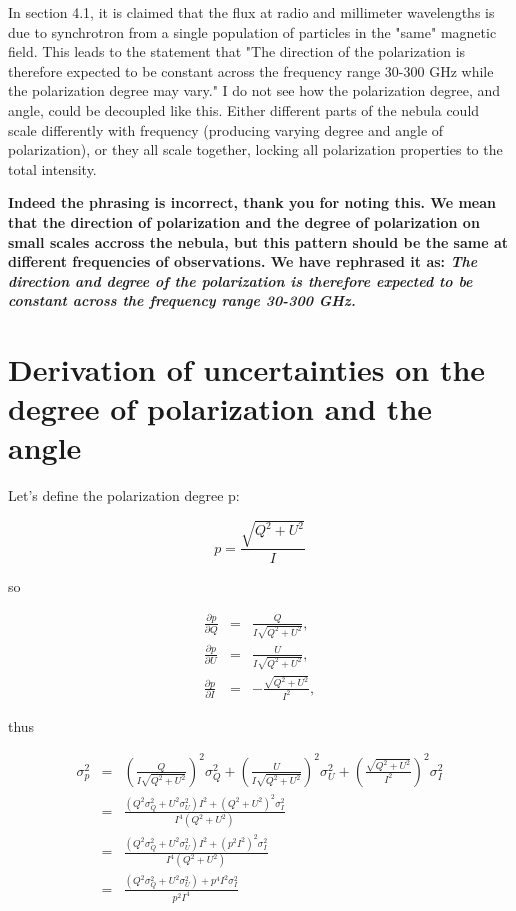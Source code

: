 \documentclass[12pt]{article}
\begin{document}
\begin{enumerate}
In section 4.1, it is claimed that the flux at radio and millimeter 
wavelengths is due to synchrotron from a single population of 
particles in the "same" magnetic field. This leads to the statement 
that "The direction of the polarization is therefore expected to be 
constant across the frequency range 30-300 GHz while the polarization 
degree may vary." I do not see how the polarization degree, and 
angle, could be decoupled like this. Either different parts of the 
nebula could scale differently with frequency (producing varying 
degree and angle of polarization), or they all scale together, locking 
all polarization properties to the total intensity.

\textbf{Indeed the phrasing is incorrect, thank you for noting this. We mean that the direction of polarization and the degree of polarization on small scales accross the nebula, but this pattern should be the same at different frequencies of observations. We have rephrased it as:
 {\it The direction and degree of the polarization is therefore expected to be constant across the frequency range 30-300 GHz.}}

\end{enumerate}

\appendix
\label{appendix}
\section{Derivation of uncertainties on the degree of polarization and the angle}

Let's define the polarization degree p:

\begin{equation}
 p    = \frac{\sqrt{Q^2 + U^2}}{I} \nonumber 
\end{equation}

so

\begin{eqnarray}
\frac{\partial p}{\partial Q} &=& \frac{Q}{I\sqrt{Q^2+U^2}}, \\
\frac{\partial p}{\partial U} &=& \frac{U}{I\sqrt{Q^2+U^2}}, \\
\frac{\partial p}{\partial I} &=& -\frac{\sqrt{Q^2+U^2}}{I^2},
\end{eqnarray}

thus

\begin{eqnarray}
\sigma_p^2 &=& \left(\frac{Q}{I\sqrt{Q^2+U^2}}\right)^2\sigma_Q^2 + 
\left(\frac{U}{I\sqrt{Q^2+U^2}}\right)^2\sigma_U^2 + 
\left(\frac{\sqrt{Q^2+U^2}}{I^2}\right)^2\sigma_I^2\\
&=&\frac{(Q^2\sigma_Q^2 + U^2\sigma_U^2)I^2 +
  (Q^2+U^2)^2\sigma_I^2}{I^4(Q^2+U^2)} \\
&=&\frac{(Q^2\sigma_Q^2 + U^2\sigma_U^2)I^2 +
  (p^2I^2)^2\sigma_I^2}{I^4(Q^2+U^2)} \\
&=&\frac{(Q^2\sigma_Q^2+U^2\sigma_U^2)+p^4I^2\sigma_I^2}{p^2I^4}
\end{eqnarray}
\end{document}
